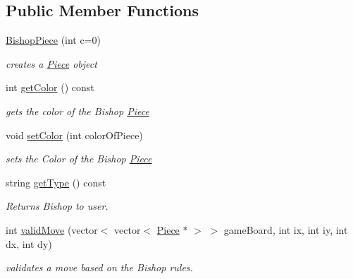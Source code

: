 \subsection*{Public Member Functions}
\begin{DoxyCompactItemize}
\item 
\hypertarget{classBishopPiece_ae5bd27defc378a878b99d95d2d11d035}{
\hyperlink{classBishopPiece_ae5bd27defc378a878b99d95d2d11d035}{BishopPiece} (int c=0)}
\label{classBishopPiece_ae5bd27defc378a878b99d95d2d11d035}

\begin{DoxyCompactList}\small\item\em creates a \hyperlink{classPiece}{Piece} object \item\end{DoxyCompactList}\item 
int \hyperlink{classBishopPiece_ae40042d8edb9172b97955a1a3d651434}{getColor} () const 
\begin{DoxyCompactList}\small\item\em gets the color of the Bishop \hyperlink{classPiece}{Piece} \item\end{DoxyCompactList}\item 
void \hyperlink{classBishopPiece_ae75166e3d3bc71f3030268158cba4054}{setColor} (int colorOfPiece)
\begin{DoxyCompactList}\small\item\em sets the Color of the Bishop \hyperlink{classPiece}{Piece} \item\end{DoxyCompactList}\item 
string \hyperlink{classBishopPiece_af651439e984e4d28955db75da601b35b}{getType} () const 
\begin{DoxyCompactList}\small\item\em Returns Bishop to user. \item\end{DoxyCompactList}\item 
int \hyperlink{classBishopPiece_a0f0ed53268ba4b42c9e95a92a183d19d}{validMove} (vector$<$ vector$<$ \hyperlink{classPiece}{Piece} $\ast$ $>$ $>$ gameBoard, int ix, int iy, int dx, int dy)
\begin{DoxyCompactList}\small\item\em validates a move based on the Bishop rules. \item\end{DoxyCompactList}\end{DoxyCompactItemize}


